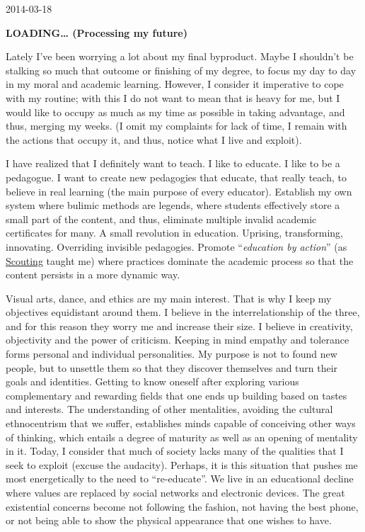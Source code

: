 \documentclass[]{book}
\begin{document}
2014-03-18

\textbf{LOADING\ldots{} (Processing my future)}

Lately I've been worrying a lot about my final byproduct. Maybe I shouldn't be stalking so much that outcome or finishing of my degree, to focus my day to day in my moral and academic learning. However, I consider it imperative to cope with my routine; with this I do not want to mean that is heavy for me, but I would like to occupy as much as my time as possible in taking advantage, and thus, merging my weeks. (I omit my complaints for lack of time, I remain with the actions that occupy it, and thus, notice what I live and exploit).

I have realized that I definitely want to teach. I like to educate. I like to be a pedagogue. I want to create new pedagogies that educate, that really teach, to believe in real learning (the main purpose of every educator). Establish my own system where bulimic methods are legends, where students effectively store a small part of the content, and thus, eliminate multiple invalid academic certificates for many. A small revolution in education. Uprising, transforming, innovating. Overriding invisible pedagogies. Promote ``\emph{education by action}'' (as \href{https://en.wikipedia.org/wiki/Scouting}{Scouting} taught me) where practices dominate the academic process so that the content persists in a more dynamic way.

Visual arts, dance, and ethics are my main interest. That is why I keep my objectives equidistant around them. I believe in the interrelationship of the three, and for this reason they worry me and increase their size. I believe in creativity, objectivity and the power of criticism. Keeping in mind empathy and tolerance forms personal and individual personalities. My purpose is not to found new people, but to unsettle them so that they discover themselves and turn their goals and identities. Getting to know oneself after exploring various complementary and rewarding fields that one ends up building based on tastes and interests. The understanding of other mentalities, avoiding the cultural ethnocentrism that we suffer, establishes minds capable of conceiving other ways of thinking, which entails a degree of maturity as well as an opening of mentality in it. Today, I consider that much of society lacks many of the qualities that I seek to exploit (excuse the audacity). Perhaps, it is this situation that pushes me most energetically to the need to ``re-educate''. We live in an educational decline where values are replaced by social networks and electronic devices. The great existential concerns become not following the fashion, not having the best phone, or not being able to show the physical appearance that one wishes to have.
\end{document}
